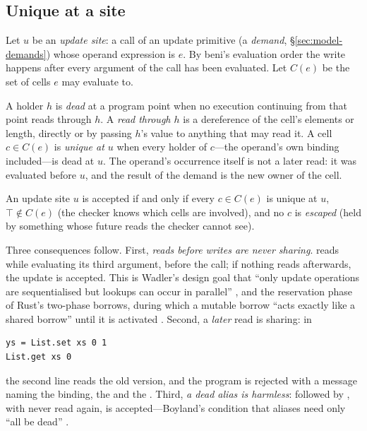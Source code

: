 \subsection{Unique at a site}
\label{sec:model-unique}

Let $u$ be an \emph{update site}: a call of an update primitive (a \emph{demand},
\S\ref{sec:model-demands}) whose operand expression is $e$. By beni's evaluation order the write
happens after every argument of the call has been evaluated. Let $C(e)$ be the set of cells $e$ may
evaluate to.

\begin{definition}
\label{def:unique}
A holder $h$ is \emph{dead} at a program point when no execution continuing from that point reads
through $h$. A \emph{read through $h$} is a dereference of the cell's elements or length, directly
or by passing $h$'s value to anything that may read it. A cell $c \in C(e)$ is \emph{unique at $u$}
when every holder of $c$---the operand's own binding included---is dead at $u$. The operand's
occurrence itself is not a later read: it was evaluated before $u$, and the result of the demand is
the new owner of the cell.
\end{definition}

\begin{definition}
An update site $u$ is accepted if and only if every $c \in C(e)$ is unique at $u$, $\top \notin
C(e)$ (the checker knows which cells are involved), and no $c$ is \emph{escaped} (held by something
whose future reads the checker cannot see).
\end{definition}

Three consequences follow. First, \emph{reads before writes are never sharing}.
 reads  while evaluating its third argument, before
the call; if nothing reads  afterwards, the update is accepted. This is Wadler's design goal
that ``only update operations are sequentialised but lookups can occur in parallel''
\citep[\S3]{wadler1991use}, and the reservation phase of Rust's two-phase borrows, during which a
mutable borrow ``acts exactly like a shared borrow'' until it is activated \citep{rfc2025}.
Second, a \emph{later} read is sharing: in
\begin{Verbatim}
ys = List.set xs 0 1
List.get xs 0
\end{Verbatim}
the second line reads the old version, and the program is rejected with a message naming the
binding, the  and the . Third, \emph{a dead alias is harmless}:
 followed by , with  never read again, is
accepted---Boyland's condition that aliases need only ``all be dead''
\citep[\S3.2]{boyland2001alias}.

